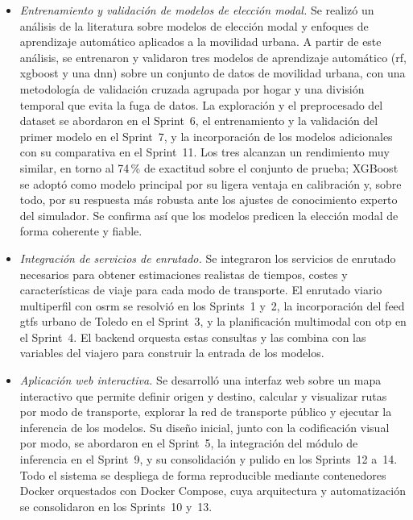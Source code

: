 \begin{itemize}
    \item \textit{Entrenamiento y validación de modelos de elección modal.} Se realizó un análisis de la literatura sobre modelos de elección modal y enfoques de aprendizaje automático aplicados a la movilidad urbana. A partir de este análisis,  se entrenaron y validaron tres modelos de aprendizaje automático (\acrlong{rf}, \gls{xgboost} y una \acrlong{dnn}) sobre un conjunto de datos de movilidad urbana, con una metodología de validación cruzada agrupada por hogar y una división temporal que evita la fuga de datos. La exploración y el preprocesado del dataset se abordaron en el Sprint~6, el entrenamiento y la validación del primer modelo en el Sprint~7, y la incorporación de los modelos adicionales con su comparativa en el Sprint~11. Los tres alcanzan un rendimiento muy similar, en torno al 74\,\% de exactitud sobre el conjunto de prueba; XGBoost se adoptó como modelo principal por su ligera ventaja en calibración y, sobre todo, por su respuesta más robusta ante los ajustes de conocimiento experto del simulador. Se confirma así que los modelos predicen la elección modal de forma coherente y fiable.\newline
    
    \item \textit{Integración de servicios de enrutado.} Se integraron los servicios de enrutado necesarios para obtener estimaciones realistas de tiempos, costes y características de viaje para cada modo de transporte. El enrutado viario multiperfil con \gls{osrm} se resolvió en los Sprints~1 y~2, la incorporación del feed \gls{gtfs} urbano de Toledo en el Sprint~3, y la planificación multimodal con \gls{otp} en el Sprint~4. El backend orquesta estas consultas y las combina con las variables del viajero para construir la entrada de los modelos.\newline

    \item \textit{Aplicación web interactiva.} Se desarrolló una interfaz web sobre un mapa interactivo que permite definir origen y destino, calcular y visualizar rutas por modo de transporte, explorar la red de transporte público y ejecutar la inferencia de los modelos. Su diseño inicial, junto con la codificación visual por modo, se abordaron en el Sprint~5, la integración del módulo de inferencia en el Sprint~9, y su consolidación y pulido en los Sprints~12 a~14. Todo el sistema se despliega de forma reproducible mediante contenedores Docker orquestados con Docker Compose, cuya arquitectura y automatización se consolidaron en los Sprints~10 y~13.\newline


\end{itemize}

